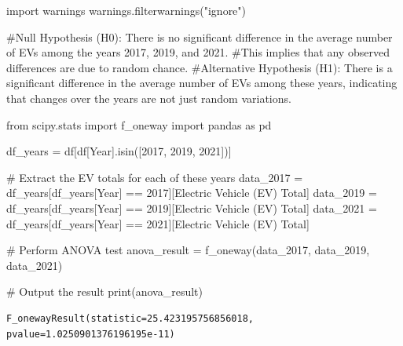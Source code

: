 \documentclass[
  letterpaper,
  DIV=11,
  numbers=noendperiod]{scrartcl}
\newenvironment{Shaded}{\begin{snugshade}}{\end{snugshade}}
\newcommand{\BuiltInTok}[1]{\textcolor[rgb]{0.00,0.23,0.31}{#1}}
\newcommand{\CommentTok}[1]{\textcolor[rgb]{0.37,0.37,0.37}{#1}}
\newcommand{\DecValTok}[1]{\textcolor[rgb]{0.68,0.00,0.00}{#1}}
\newcommand{\ImportTok}[1]{\textcolor[rgb]{0.00,0.46,0.62}{#1}}
\newcommand{\NormalTok}[1]{\textcolor[rgb]{0.00,0.23,0.31}{#1}}
\newcommand{\OperatorTok}[1]{\textcolor[rgb]{0.37,0.37,0.37}{#1}}
\newcommand{\StringTok}[1]{\textcolor[rgb]{0.13,0.47,0.30}{#1}}
\begin{document}
\begin{Shaded}
\begin{Highlighting}[]
\ImportTok{import}\NormalTok{ warnings}
\NormalTok{warnings.filterwarnings(}\StringTok{"ignore"}\NormalTok{)}

\CommentTok{\#Null Hypothesis (H0): There is no significant difference in the average number of EVs among the years 2017, 2019, and 2021. }
\CommentTok{\#This implies that any observed differences are due to random chance.}
\CommentTok{\#Alternative Hypothesis (H1): There is a significant difference in the average number of EVs among these years, indicating that changes over the years are not just random variations.}

\ImportTok{from}\NormalTok{ scipy.stats }\ImportTok{import}\NormalTok{ f\_oneway}
\ImportTok{import}\NormalTok{ pandas }\ImportTok{as}\NormalTok{ pd}

\NormalTok{df\_years }\OperatorTok{=}\NormalTok{ df[df[}\StringTok{\textquotesingle{}Year\textquotesingle{}}\NormalTok{].isin([}\DecValTok{2017}\NormalTok{, }\DecValTok{2019}\NormalTok{, }\DecValTok{2021}\NormalTok{])]}

\CommentTok{\# Extract the EV totals for each of these years}
\NormalTok{data\_2017 }\OperatorTok{=}\NormalTok{ df\_years[df\_years[}\StringTok{\textquotesingle{}Year\textquotesingle{}}\NormalTok{] }\OperatorTok{==} \DecValTok{2017}\NormalTok{][}\StringTok{\textquotesingle{}Electric Vehicle (EV) Total\textquotesingle{}}\NormalTok{]}
\NormalTok{data\_2019 }\OperatorTok{=}\NormalTok{ df\_years[df\_years[}\StringTok{\textquotesingle{}Year\textquotesingle{}}\NormalTok{] }\OperatorTok{==} \DecValTok{2019}\NormalTok{][}\StringTok{\textquotesingle{}Electric Vehicle (EV) Total\textquotesingle{}}\NormalTok{]}
\NormalTok{data\_2021 }\OperatorTok{=}\NormalTok{ df\_years[df\_years[}\StringTok{\textquotesingle{}Year\textquotesingle{}}\NormalTok{] }\OperatorTok{==} \DecValTok{2021}\NormalTok{][}\StringTok{\textquotesingle{}Electric Vehicle (EV) Total\textquotesingle{}}\NormalTok{]}

\CommentTok{\# Perform ANOVA test}
\NormalTok{anova\_result }\OperatorTok{=}\NormalTok{ f\_oneway(data\_2017, data\_2019, data\_2021)}

\CommentTok{\# Output the result}
\BuiltInTok{print}\NormalTok{(anova\_result)}
\end{Highlighting}
\end{Shaded}

\begin{verbatim}
F_onewayResult(statistic=25.423195756856018, pvalue=1.0250901376196195e-11)
\end{verbatim}
\end{document}
